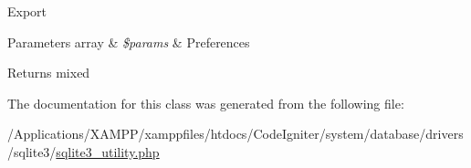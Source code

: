 Export


\begin{DoxyParams}[1]{Parameters}
array & {\em \$params} & Preferences \\
\hline
\end{DoxyParams}
\begin{DoxyReturn}{Returns}
mixed 
\end{DoxyReturn}


The documentation for this class was generated from the following file\+:\begin{DoxyCompactItemize}
\item 
/\+Applications/\+X\+A\+M\+P\+P/xamppfiles/htdocs/\+Code\+Igniter/system/database/drivers/sqlite3/\mbox{\hyperlink{sqlite3__utility_8php}{sqlite3\+\_\+utility.\+php}}\end{DoxyCompactItemize}
